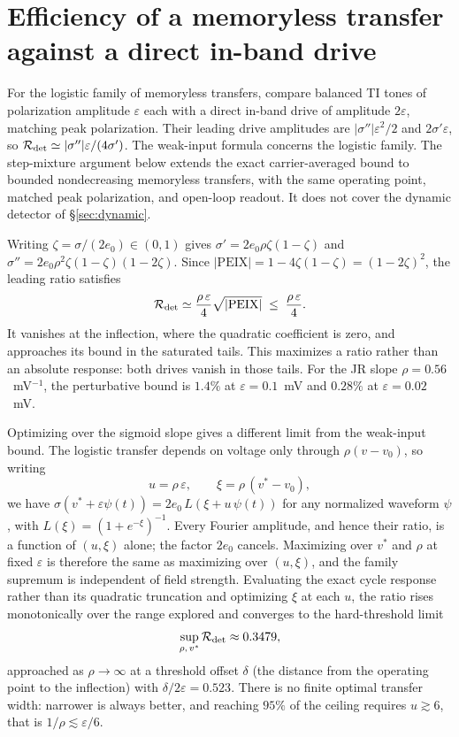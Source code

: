 \documentclass[11pt,a4paper]{article}
\newcommand{\Sig}{\sigma}
\begin{document}
\section{Efficiency of a memoryless transfer against a direct in-band drive}\label{app:bound}
For the logistic family of memoryless transfers, compare balanced TI tones of
polarization amplitude $\varepsilon$ each with a direct in-band drive of amplitude
$2\varepsilon$, matching peak polarization. Their leading drive amplitudes are
$|\Sig''|\varepsilon^2/2$ and $2\Sig'\varepsilon$, so
$\mathcal R_{\rm det}\simeq|\Sig''|\varepsilon/(4\Sig')$.
The weak-input formula concerns the logistic family. The step-mixture argument
below extends the exact carrier-averaged bound to bounded nondecreasing
memoryless transfers, with the same operating point, matched peak polarization,
and open-loop readout. It does not cover the dynamic detector of \S\ref{sec:dynamic}.

Writing $\zeta=\Sig/(2e_0)\in(0,1)$ gives
$\Sig'=2e_0\rho\zeta(1-\zeta)$ and
$\Sig''=2e_0\rho^2\zeta(1-\zeta)(1-2\zeta)$. Since
$|\mathrm{PEIX}|=1-4\zeta(1-\zeta)=(1-2\zeta)^2$, the leading ratio satisfies
\begin{equation}
\mathcal R_{\rm det}\simeq\frac{\rho\,\varepsilon}{4}\sqrt{|\mathrm{PEIX}|}
\;\le\;\frac{\rho\,\varepsilon}{4}.
\label{eq:etabound}
\end{equation}
It vanishes at the inflection, where the quadratic coefficient is zero, and
approaches its bound in the saturated tails. This maximizes a ratio rather than
an absolute response: both drives vanish in those tails. For the JR slope
$\rho=0.56$~mV$^{-1}$, the perturbative bound is $1.4\%$ at
$\varepsilon=0.1$~mV and $0.28\%$ at $\varepsilon=0.02$~mV.

Optimizing over the sigmoid slope gives a different limit from the weak-input bound.
The logistic transfer depends on voltage only through $\rho(v-v_0)$, so writing
\begin{equation}
u=\rho\,\varepsilon,\qquad \xi=\rho\,(v^*-v_0),
\label{eq:reduced}
\end{equation}
we have $\Sig(v^*+\varepsilon\psi(t))=2e_0\,L(\xi+u\,\psi(t))$ for any normalized waveform $\psi$,
with $L(\xi)=(1+e^{-\xi})^{-1}$. Every Fourier amplitude, and hence their ratio, is a function
of $(u,\xi)$ alone; the factor $2e_0$ cancels. Maximizing over $v^*$ and $\rho$ at fixed
$\varepsilon$ is therefore the same as maximizing over $(u,\xi)$, and the family supremum is
independent of field strength. Evaluating the exact cycle response rather than its
quadratic truncation and optimizing $\xi$ at each $u$, the ratio rises monotonically over the
range explored and converges to the hard-threshold limit
\begin{equation}
\sup_{\rho,\,v^*}\mathcal R_{\rm det}\approx0.3479 ,
\label{eq:etasup}
\end{equation}
approached as $\rho\to\infty$ at a threshold offset $\delta$ (the distance from the
operating point to the inflection) with $\delta/2\varepsilon=0.523$. There is no
finite optimal transfer width: narrower is always better, and reaching $95\%$ of the ceiling
requires $u\gtrsim6$, that is $1/\rho\lesssim\varepsilon/6$.
\end{document}

